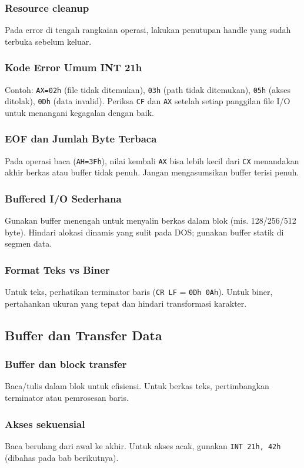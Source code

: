 \documentclass[../main.tex]{subfiles}
\begin{document}
            \subsubsection{Resource cleanup}
                Pada error di tengah rangkaian operasi, lakukan penutupan handle yang sudah terbuka sebelum keluar.

            \subsubsection{Kode Error Umum INT 21h}
                Contoh: \texttt{AX=02h} (file tidak ditemukan), \texttt{03h} (path tidak ditemukan), \texttt{05h} (akses ditolak), \texttt{0Dh} (data invalid). Periksa \texttt{CF} dan \texttt{AX} setelah setiap panggilan file I/O untuk menangani kegagalan dengan baik. 
            \subsubsection{EOF dan Jumlah Byte Terbaca}
                Pada operasi baca (\texttt{AH=3Fh}), nilai kembali \texttt{AX} bisa lebih kecil dari \texttt{CX} menandakan akhir berkas atau buffer tidak penuh. Jangan mengasumsikan buffer terisi penuh. 
            \subsubsection{Buffered I/O Sederhana}
                Gunakan buffer menengah untuk menyalin berkas dalam blok (mis. 128/256/512 byte). Hindari alokasi dinamis yang sulit pada DOS; gunakan buffer statik di segmen data. 
            \subsubsection{Format Teks vs Biner}
                Untuk teks, perhatikan terminator baris (\texttt{CR LF} = \texttt{0Dh 0Ah}). Untuk biner, pertahankan ukuran yang tepat dan hindari transformasi karakter. 

        \subsection{Buffer dan Transfer Data}
            \subsubsection{Buffer dan block transfer}
                Baca/tulis dalam blok untuk efisiensi. Untuk berkas teks, pertimbangkan terminator atau pemrosesan baris.

            \subsubsection{Akses sekuensial}
                Baca berulang dari awal ke akhir. Untuk akses acak, gunakan \texttt{INT 21h, 42h} (dibahas pada bab berikutnya).
\end{document}
